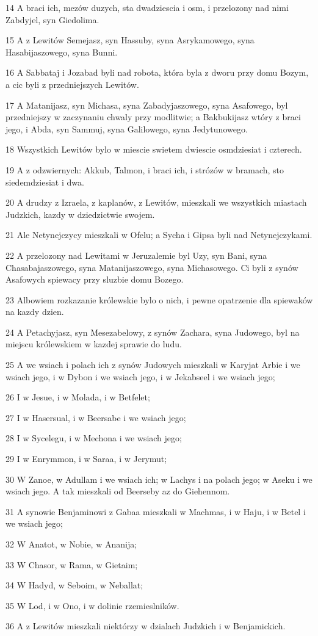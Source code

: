\par 14 A braci ich, mezów duzych, sta dwadziescia i osm, i przelozony nad nimi Zabdyjel, syn Giedolima.
\par 15 A z Lewitów Semejasz, syn Hassuby, syna Asrykamowego, syna Hasabijaszowego, syna Bunni.
\par 16 A Sabbataj i Jozabad byli nad robota, która byla z dworu przy domu Bozym, a cic byli z przedniejszych Lewitów.
\par 17 A Matanijasz, syn Michasa, syna Zabadyjaszowego, syna Asafowego, byl przedniejszy w zaczynaniu chwaly przy modlitwie; a Bakbukijasz wtóry z braci jego, i Abda, syn Sammuj, syna Galilowego, syna Jedytunowego.
\par 18 Wszystkich Lewitów bylo w miescie swietem dwiescie osmdziesiat i czterech.
\par 19 A z odzwiernych: Akkub, Talmon, i braci ich, i strózów w bramach, sto siedemdziesiat i dwa.
\par 20 A drudzy z Izraela, z kaplanów, z Lewitów, mieszkali we wszystkich miastach Judzkich, kazdy w dziedzictwie swojem.
\par 21 Ale Netynejczycy mieszkali w Ofelu; a Sycha i Gipsa byli nad Netynejczykami.
\par 22 A przelozony nad Lewitami w Jeruzalemie byl Uzy, syn Bani, syna Chasabajaszowego, syna Matanijaszowego, syna Michasowego. Ci byli z synów Asafowych spiewacy przy sluzbie domu Bozego.
\par 23 Albowiem rozkazanie królewskie bylo o nich, i pewne opatrzenie dla spiewaków na kazdy dzien.
\par 24 A Petachyjasz, syn Mesezabelowy, z synów Zachara, syna Judowego, byl na miejscu królewskiem w kazdej sprawie do ludu.
\par 25 A we wsiach i polach ich z synów Judowych mieszkali w Karyjat Arbie i we wsiach jego, i w Dybon i we wsiach jego, i w Jekabseel i we wsiach jego;
\par 26 I w Jesue, i w Molada, i w Betfelet;
\par 27 I w Hasersual, i w Beersabe i we wsiach jego;
\par 28 I w Sycelegu, i w Mechona i we wsiach jego;
\par 29 I w Enrymmon, i w Saraa, i w Jerymut;
\par 30 W Zanoe, w Adullam i we wsiach ich; w Lachys i na polach jego; w Aseku i we wsiach jego. A tak mieszkali od Beerseby az do Giehennom.
\par 31 A synowie Benjaminowi z Gabaa mieszkali w Machmas, i w Haju, i w Betel i we wsiach jego;
\par 32 W Anatot, w Nobie, w Ananija;
\par 33 W Chasor, w Rama, w Gietaim;
\par 34 W Hadyd, w Seboim, w Neballat;
\par 35 W Lod, i w Ono, i w dolinie rzemieslników.
\par 36 A z Lewitów mieszkali niektórzy w dzialach Judzkich i w Benjamickich.


